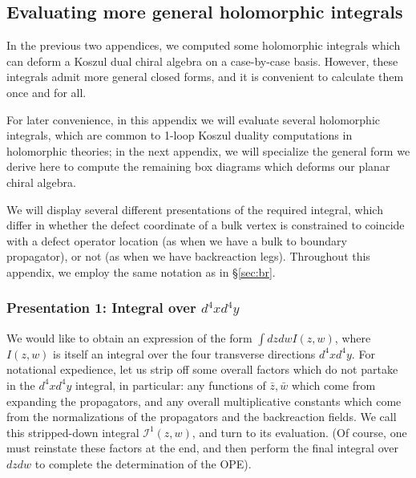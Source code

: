 \documentclass[../main.tex]{subfiles}
\begin{document}
\subsection{Evaluating more general holomorphic integrals}\label{appx:integral}

In the previous two appendices, we computed some holomorphic integrals which can deform a Koszul dual chiral algebra on a case-by-case basis. However, these integrals admit more general closed forms, and it is convenient to calculate them once and for all. 

For later convenience, in this appendix we will evaluate several holomorphic integrals, which are common to 1-loop Koszul duality computations in holomorphic theories; in the next appendix, we will specialize the general form we derive here to compute the remaining box diagrams which deforms our planar chiral algebra. 

We will display several different presentations of the required integral, which differ in whether the defect coordinate of a bulk vertex is constrained to coincide with a defect operator location (as when we have a bulk to boundary propagator), or not (as when we have backreaction legs). Throughout this appendix, we employ the same notation as in \S \ref{sec:br}.

\subsubsection{Presentation 1: Integral over $d^4x d^4 y$} 

We would like to obtain an expression of the form $\int dz dw I(z, w)$, where $I(z, w)$ is itself an integral over the four transverse directions $d^4x d^4y$. For notational expedience, let us strip off some overall factors which do not partake in the $d^4x d^4 y$ integral, in particular: any functions of $\bar{z}, \bar{w}$ which come from expanding the propagators, and any overall multiplicative constants which come from the normalizations of the propagators and the backreaction fields. We call this stripped-down integral $\mathcal{I}^1(z, w)$, and turn to its evaluation. (Of course, one must reinstate these factors at the end, and then perform the final integral over $dz dw$ to complete the determination of the OPE). 
\end{document}
